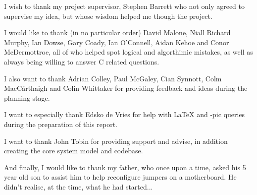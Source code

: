 
I wish to thank my project supervisor, Stephen Barrett who not only
agreed to supervise my idea, but whose wisdom helped me though the
project.


I would like to thank (in no particular order) David Malone, Niall 
Richard Murphy, Ian Dowse, Gary Coady, Ian O'Connell, Aidan Kehoe and 
Conor McDermottroe, all of who helped spot logical and algorthimic 
mistakes, as well as always being willing to answer C related 
questions.


I also want to thank Adrian Colley, Paul McGaley, Cian Synnott, Colm
MacC\'{a}rthaigh and Colin Whittaker for providing feedback and ideas 
during the planning stage.


I want to especially thank Edsko de Vries for help with \LaTeX \space 
and \Xy-pic queries during the preparation of this report.


I want to thank John Tobin for providing support and advise, in 
addition creating the core system model and codebase.


And finally, I would like to thank my father, who once upon a time, 
asked his 5 year old son to assist him to help reconfigure jumpers on
a motherboard. He didn't realise, at the time, what he had started...
